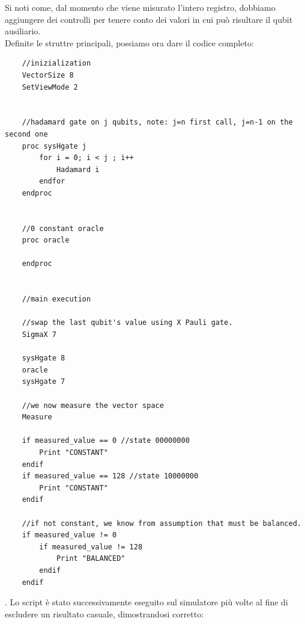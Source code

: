 \documentclass[12pt,a4paper,openright]{report}
\begin{document}
Si noti come, dal momento che viene misurato l'intero registro, dobbiamo aggiungere dei controlli per tenere conto dei valori in cui può risultare il qubit ausiliario.\\

\newpage
Definite le struttre principali, possiamo ora dare il codice completo:

\begin{lstlisting}
    //inizialization
    VectorSize 8
    SetViewMode 2
    
    
    //hadamard gate on j qubits, note: j=n first call, j=n-1 on the second one
    proc sysHgate j
        for i = 0; i < j ; i++
            Hadamard i
        endfor
    endproc
    
    
    //0 constant oracle
    proc oracle

    endproc
    
    
    //main execution
    
    //swap the last qubit's value using X Pauli gate.
    SigmaX 7
    
    sysHgate 8
    oracle
    sysHgate 7
    
    //we now measure the vector space
    Measure
    
    if measured_value == 0 //state 00000000 
        Print "CONSTANT"
    endif
    if measured_value == 128 //state 10000000
        Print "CONSTANT"
    endif
    
    //if not constant, we know from assumption that must be balanced.
    if measured_value != 0
        if measured_value != 128
            Print "BALANCED"
        endif
    endif
    \end{lstlisting}

. Lo script è stato successivamente eseguito sul simulatore più volte al fine di escludere un risultato casuale, dimostrandosi corretto:
\end{document}
